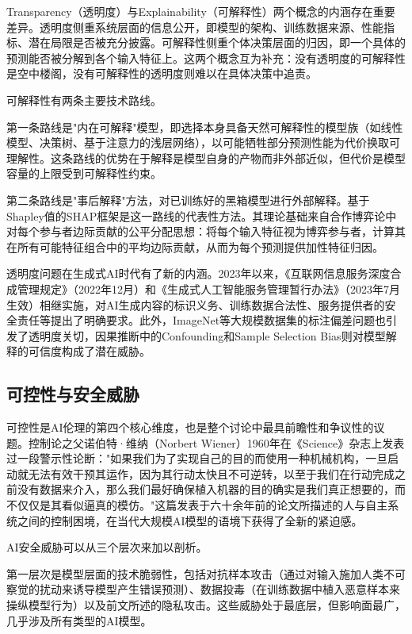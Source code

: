 \documentclass[12pt,a4paper]{ctexart}
\begin{document}
Transparency（透明度）与Explainability（可解释性）两个概念的内涵存在重要差异。透明度侧重系统层面的信息公开，即模型的架构、训练数据来源、性能指标、潜在局限是否被充分披露。可解释性侧重个体决策层面的归因，即一个具体的预测能否被分解到各个输入特征上。这两个概念互为补充：没有透明度的可解释性是空中楼阁，没有可解释性的透明度则难以在具体决策中追责。

可解释性有两条主要技术路线。

第一条路线是"内在可解释"模型，即选择本身具备天然可解释性的模型族（如线性模型、决策树、基于注意力的浅层网络），以可能牺牲部分预测性能为代价换取可理解性。这条路线的优势在于解释是模型自身的产物而非外部近似，但代价是模型容量的上限受到可解释性约束。

第二条路线是"事后解释"方法，对已训练好的黑箱模型进行外部解释。基于Shapley值的SHAP框架是这一路线的代表性方法。其理论基础来自合作博弈论中对每个参与者边际贡献的公平分配思想：将每个输入特征视为博弈参与者，计算其在所有可能特征组合中的平均边际贡献，从而为每个预测提供加性特征归因。

透明度问题在生成式AI时代有了新的内涵。2023年以来，《互联网信息服务深度合成管理规定》（2022年12月）和《生成式人工智能服务管理暂行办法》（2023年7月生效）相继实施，对AI生成内容的标识义务、训练数据合法性、服务提供者的安全责任等提出了明确要求。此外，ImageNet等大规模数据集的标注偏差问题也引发了透明度关切，因果推断中的Confounding和Sample Selection Bias则对模型解释的可信度构成了潜在威胁。

\subsection{可控性与安全威胁}

可控性是AI伦理的第四个核心维度，也是整个讨论中最具前瞻性和争议性的议题。控制论之父诺伯特·维纳（Norbert Wiener）1960年在《Science》杂志上发表过一段警示性论断："如果我们为了实现自己的目的而使用一种机械机构，一旦启动就无法有效干预其运作，因为其行动太快且不可逆转，以至于我们在行动完成之前没有数据来介入，那么我们最好确保植入机器的目的确实是我们真正想要的，而不仅仅是其看似逼真的模仿。"这篇发表于六十余年前的论文所描述的人与自主系统之间的控制困境，在当代大规模AI模型的语境下获得了全新的紧迫感。

AI安全威胁可以从三个层次来加以剖析。

第一层次是模型层面的技术脆弱性，包括对抗样本攻击（通过对输入施加人类不可察觉的扰动来诱导模型产生错误预测）、数据投毒（在训练数据中植入恶意样本来操纵模型行为）以及前文所述的隐私攻击。这些威胁处于最底层，但影响面最广，几乎涉及所有类型的AI模型。
\end{document}
